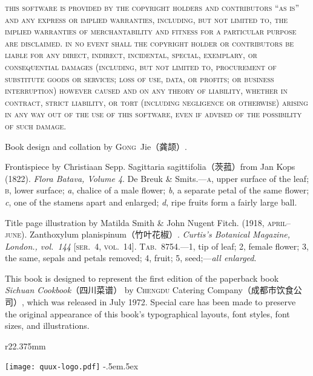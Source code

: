 \begingroup%
%
\textsc{this software is provided by the copyright holders and contributors
``as is'' and any express or implied warranties, including, but not limited to,
the implied warranties of merchantability and fitness for a particular purpose
are disclaimed. in no event shall the copyright holder or contributors be
liable for any direct, indirect, incidental, special, exemplary, or
consequential damages (including, but not limited to, procurement of
substitute goods or services; loss of use, data, or profits; or business
interruption) however caused and on any theory of liability, whether in
contract, strict liability, or tort (including negligence or otherwise)
arising in any way out of the use of this software, even if advised of the
possibility of such damage.}

\endgroup

\vspace{-.5\baselineskip}

\vfill

\setlength{\parskip}{.5\baselineskip}%

Book design and collation by \textsc{Gong}~Jie\!（龚颉）\!\!\!.

Frontispiece by Christiaan Sepp. Sagittaria sagittifolia\!（茨菰）\!from Jan
Kops (1822). \textit{Flora Batava, Volume 4}. De Breuk \& Smits.---\textsc{a},
upper surface of the leaf; \textsc{b}, lower surface; \textit{a}, chalice of a
male flower; \textit{b}, a separate petal of the same flower; \textit{c}, one
of the stamens apart and enlarged; \textit{d}, ripe fruits form a fairly large
ball.

Title page illustration by Matilda Smith \& John Nugent Fitch. (1918,
\textsc{april--june}). Zanthoxylum planispinum\!（竹叶花椒）\!\!\!.
\textit{Curtis's Botanical Magazine, London., vol.~144} [\textsc{ser}.~4,
\textsc{vol}.~14]. \textsc{Tab}.~8754.---1, tip of leaf; 2, female flower;
3, the same, sepals and petals removed; 4, fruit; 5, seed;---\textit{all
enlarged}.

This book is designed to represent the first edition of the paperback book
\textit{Sichuan Cookbook}{\kafamily（四川菜谱）}\!\! by \textsc{Chengdu}
Catering Company\!（成都市饮食公司）\!\!\!, which was released in July 1972.
Special care has been made to preserve the original appearance of this book's
typographical layouts, font styles, font sizes, and illustrations.

\begin{wrapfigure}{r}{22.375mm}%
\vspace{-2.8125\baselineskip}%
\begin{flushright}%
\texttt{[image: quux-logo.pdf]}%
{\sffamily\tiny\kern-.5em\lower.5ex\hbox{\texttrademark}}%
\end{flushright}%
\vspace{-1.75\baselineskip}%
\end{wrapfigure}%

